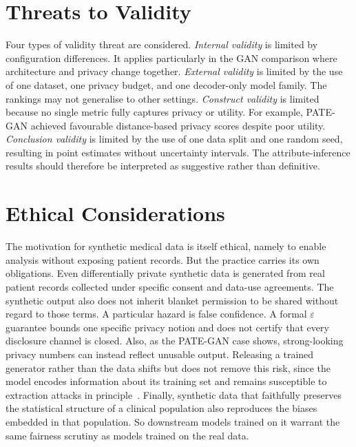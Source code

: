 \section{Threats to Validity}
\label{sec:discussion:validity}
Four types of validity threat are considered. \emph{Internal validity}
is limited by configuration differences. It applies particularly in the GAN
comparison where architecture and privacy change together.
\emph{External validity} is limited by the use of one dataset, one
privacy budget, and one decoder-only model family. The rankings may not
generalise to other settings. \emph{Construct validity} is limited
because no single metric fully captures privacy or utility. For example,
PATE-GAN achieved favourable distance-based privacy scores despite poor
utility. \emph{Conclusion validity} is limited by the use of one data
split and one random seed, resulting in point estimates without
uncertainty intervals. The attribute-inference results should therefore
be interpreted as suggestive rather than definitive.

\section{Ethical Considerations}
\label{sec:discussion:ethics}

The motivation for synthetic medical data is itself ethical, namely to
enable analysis without exposing patient records. But the practice carries
its own obligations. Even differentially private synthetic data is generated
from real patient records collected under specific consent and data-use
agreements. The synthetic output also does not inherit blanket permission to
be shared without regard to those terms. A particular hazard is false
confidence. A formal $\varepsilon$ guarantee bounds one specific privacy
notion and does not certify that every disclosure channel is closed. Also, as
the PATE-GAN case shows, strong-looking privacy numbers can instead reflect
unusable output. Releasing a trained generator rather than the data shifts
but does not remove this risk, since the model encodes information about its
training set and remains susceptible to extraction attacks in
principle~\cite{Carlini2021Extracting}. Finally, synthetic data that
faithfully preserves the statistical structure of a clinical population also
reproduces the biases embedded in that population. So downstream models
trained on it warrant the same fairness scrutiny as models trained on the
real data.

\cleardoublepage
